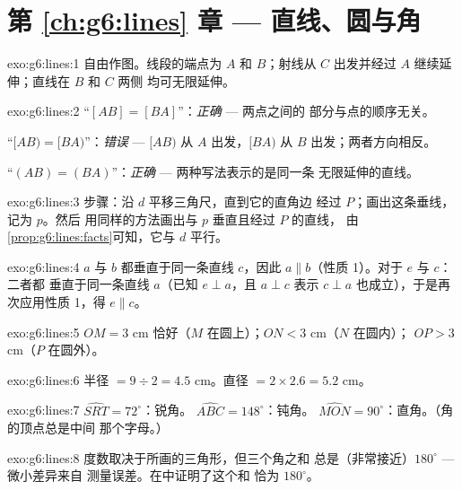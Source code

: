 \section*{第 \ref{ch:g6:lines} 章 --- 直线、圆与角}

\begin{solution}{exo:g6:lines:1}
自由作图。线段的端点为 $A$ 和 $B$；射线从
$C$ 出发并经过 $A$ 继续延伸；直线在 $B$ 和 $C$ 两侧
均可无限延伸。
\end{solution}

\begin{solution}{exo:g6:lines:2}
“$[AB] = [BA]$”：\emph{正确} --- 两点之间的
部分与点的顺序无关。

“$[AB) = [BA)$”：\emph{错误} --- $[AB)$ 从 $A$ 出发，$[BA)$ 从
$B$ 出发；两者方向相反。

“$(AB) = (BA)$”：\emph{正确} --- 两种写法表示的是同一条
无限延伸的直线。
\end{solution}

\begin{solution}{exo:g6:lines:3}
步骤：沿 $d$ 平移三角尺，直到它的直角边
经过 $P$；画出这条垂线，记为 $p$。然后
用同样的方法画出与 $p$ 垂直且经过 $P$ 的直线，
由\cref{prop:g6:lines:facts}可知，它与 $d$ 平行。
\end{solution}

\begin{solution}{exo:g6:lines:4}
$a$ 与 $b$ 都垂直于同一条直线 $c$，因此
$a \parallel b$（性质 1）。对于 $e$ 与 $c$：二者都
垂直于同一条直线 $a$（已知 $e \perp a$，且 $a \perp c$ 表示
$c \perp a$ 也成立），于是再次应用性质 1，得 $e \parallel c$。
\end{solution}

\begin{solution}{exo:g6:lines:5}
$OM = 3$ cm 恰好（$M$ 在圆上）；$ON < 3$ cm（$N$ 在圆内）；
$OP > 3$ cm（$P$ 在圆外）。
\end{solution}

\begin{solution}{exo:g6:lines:6}
半径 $= 9 \div 2 = 4.5$ cm。\quad 直径 $= 2 \times 2.6 = 5.2$ cm。
\end{solution}

\begin{solution}{exo:g6:lines:7}
$\widehat{SRT} = 72^\circ$：锐角。\quad
$\widehat{ABC} = 148^\circ$：钝角。\quad
$\widehat{MON} = 90^\circ$：直角。（角的顶点总是中间
那个字母。）
\end{solution}

\begin{solution}{exo:g6:lines:8}
度数取决于所画的三角形，但三个角之和
总是（非常接近）$180^\circ$ --- 微小差异来自
测量误差。在中证明了这个和
恰为 $180^\circ$。
\end{solution}

